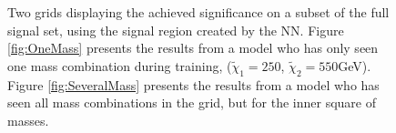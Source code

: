 \begin{figure}
    \caption{Two grids displaying the achieved significance on a subset of the full signal set, using the signal region 
    created by the \ac{NN}. Figure \ref{fig:OneMass} presents the results from a model who has only seen one mass combination 
    during training, ($\tilde{\chi}_1=250$, $\tilde{\chi}_2=550$GeV). Figure \ref{fig:SeveralMass} presents the results from 
    a model who has seen all mass combinations in the grid, but for the inner square of masses. }
    \label{fig:Interpolation}
\end{figure}

